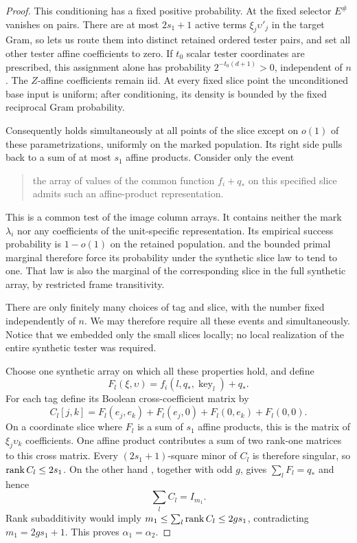\begin{proof}
This conditioning has a fixed positive probability.
At the fixed selector \(E^\#\) vanishes on pairs.
There are at most \(2s_1+1\) active terms
\(\xi_j\upsilon'_j\) in the target Gram, so
 lets us route them into
distinct retained ordered tester pairs, and set all other
tester affine coefficients to zero.  If \(t_0\) scalar
tester coordinates are prescribed, this assignment alone
has probability \(2^{-t_0(d+1)}>0\), independent of \(n\).
The \(Z\)-affine coefficients remain iid.
At every fixed slice point the unconditioned base input is
uniform; after conditioning, its density is bounded by the
fixed reciprocal Gram probability.

Consequently  holds simultaneously
at all points of the slice except on \(o(1)\) of these
parametrizations, uniformly on the marked population.
Its right side pulls back to a sum of at most \(s_1\)
affine products.  Consider only the event
\begin{quote}
the array of values of the common function \(f_i+q_*\) on
this specified slice admits such an affine-product
representation.
\end{quote}
This is a common test of the image column arrays.  It contains
neither the mark \(\lambda_i\) nor any coefficients of the
unit-specific representation.  Its empirical success
probability is \(1-o(1)\) on the retained population.
 and the bounded primal marginal
therefore force its probability under the synthetic slice
law to tend to one.  That law is also the marginal of the
corresponding slice in the full synthetic array, by restricted
frame transitivity.

There are only finitely many choices of tag and slice, with
the number fixed independently of \(n\).  We may therefore
require all these events and 
simultaneously.  Notice that we embedded only the small
slices locally; no local realization of the entire synthetic
tester was required.

Choose one synthetic array on which all these properties hold,
and define
\[
 F_l(\xi,\upsilon)
   =f_i(l,q_*,\operatorname{key}_l)+q_*.
 \]
For each tag define its Boolean cross-coefficient matrix by
\[
 C_l[j,k]=F_l(e_j,e_k)+F_l(e_j,0)
                 +F_l(0,e_k)+F_l(0,0).
 \]
On a coordinate slice where \(F_l\) is a sum of \(s_1\)
affine products, this is the matrix of \(\xi_j\upsilon_k\)
coefficients.  One affine product contributes a sum of two
rank-one matrices to this cross matrix.  Every
\((2s_1+1)\)-square minor of \(C_l\) is therefore singular,
so \(\operatorname{rank} C_l\le2s_1\).
On the other hand , together with
odd \(g\), gives \(\sum_lF_l=q_*\) and hence
\[
 \sum_l C_l=I_{m_1}.
 \]
Rank subadditivity would imply
\(m_1\le\sum_l\operatorname{rank} C_l\le2gs_1\), contradicting
\(m_1=2gs_1+1\).  This proves \(\alpha_1=\alpha_2\).
\end{proof}

